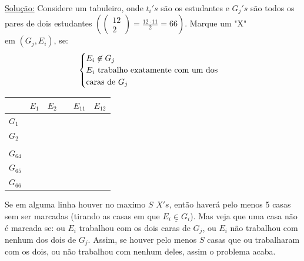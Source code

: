 \documentclass[a4paper,12pt]{article}
\theoremstyle{plain} %
\theoremstyle{definition} %
\theoremstyle{remark} %
\begin{document}
	\begin{framed}
		\begin{multicols}{2}
			\underline{Solu\c{c}\~ao:} Considere um tabuleiro, onde $t_i's$ s\~ao os estudantes e $G_j's$ s\~ao todos os pares de dois estudantes $\left(\left(\begin{smallmatrix}
				12\\
				2
			\end{smallmatrix}\right)=\frac{12\cdot11}{2}=66\right)$. Marque um "X" \\em $(G_j, E_i)$, se: \begin{equation*}
				\begin{cases}
					E_i\not\in G_j \hfill\\
					E_i \text{ trabalho exatamente com um dos}\\
					\text{caras de } G_j\hfill\\  
				\end{cases}
			\end{equation*} 
			
			\columnbreak
			
			\hspace{3em}\begin{tabular}{|l|l|l|l|l|l|}
				\hline
				\cellcolor[HTML]{000000} & $E_1$ & $E_2$ & \hspace{2em} & $E_{11}$ & $E_{12}$ \\ \hline
				$G_1$                    &       &       &              &          &          \\ \hline
				$G_2$                    &       &       &              &          &          \\ \hline
				&       &       &              &          &          \\ \hline
				$G_{64}$                 &       &       &              &          &          \\ \hline
				$G_{65}$                 &       &       &              &          &          \\ \hline
				$G_{66}$                 &       &       &              &          &          \\ \hline
			\end{tabular}
		\end{multicols}
		
		Se em alguma linha houver no maximo $S$ $X's$, ent\~ao haver\'a pelo menos 5 casas sem ser marcadas (tirando as casas em que $E_i\underline{\in} G_i$). Mas veja que uma casa n\~ao \'e marcada se: ou $E_i$ trabalhou com os dois caras de $G_j$, ou $E_i$ n\~ao trabalhou com nenhum dos dois de $G_j$. Assim, se houver pelo menos $S$ casas que ou trabalharam com os dois, ou n\~ao trabalhou com nenhum deles, assim o problema acaba. 
		

\end{framed}
\end{document}
